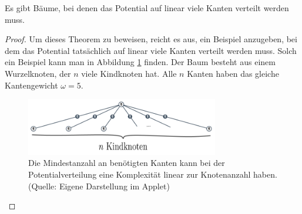 \begin{theorem}\label{theorem_pot_auf_linear_vielen_kanten}
	Es gibt Bäume, bei denen das Potential auf linear viele Kanten verteilt werden muss.
\end{theorem}	
\begin{proof}
	Um dieses Theorem zu beweisen, reicht es aus, ein Beispiel anzugeben, bei dem das Potential tatsächlich auf linear viele Kanten verteilt werden muss. Solch ein Beispiel kann man in Abbildung \ref{abb_bsp_potverteilen} finden. Der Baum besteht aus einem Wurzelknoten, der $n$ viele Kindknoten hat. Alle $n$ Kanten haben das gleiche Kantengewicht $\omega = 5$.
	
		\begin{figure}[htb]
			\includegraphics[width=0.75\textwidth]{bilder/abb_bsp_potverteilen.png} 
			\captionsetup{width=0.75\textwidth}
			\caption{Die Mindestanzahl an benötigten Kanten kann bei der Potentialverteilung eine Komplexität linear zur Knotenanzahl haben. (Quelle: Eigene Darstellung im Applet)}
			\label{abb_bsp_potverteilen}
		\end{figure}
		

\end{proof}
